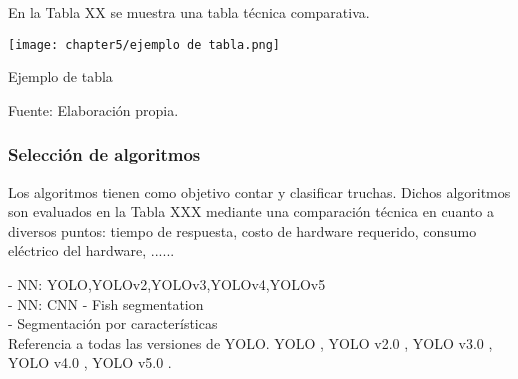 En la Tabla XX se muestra una tabla técnica comparativa.

\begin{myfigure}[H]
	\centering
	\texttt{[image: chapter5/ejemplo de tabla.png]}
	\caption{Ejemplo de tabla}
	\begin{myflushleftportland}
		Fuente: Elaboración propia.
	\end{myflushleftportland}
	\label{fig:ejemplo de tabla}
\end{myfigure}

\subsubsection{Selección de algoritmos}
\label{sssec:seleccion de algoritmos}

Los algoritmos tienen como objetivo contar y clasificar truchas. Dichos algoritmos son evaluados en la Tabla XXX mediante una comparación técnica en cuanto a diversos puntos: tiempo de respuesta, costo de hardware requerido, consumo eléctrico del hardware, ......

- NN: YOLO,YOLOv2,YOLOv3,YOLOv4,YOLOv5 \\
- NN: CNN - Fish segmentation \\
- Segmentación por características \\

Referencia a todas las versiones de YOLO. YOLO \cite{Redmon2016}, YOLO v2.0 \cite{Redmon2017}, YOLO v3.0 \cite{Redmon2018}, YOLO v4.0 \cite{Solawetz2020}, YOLO v5.0 \cite{bochkovskiy2020yolov4}.


